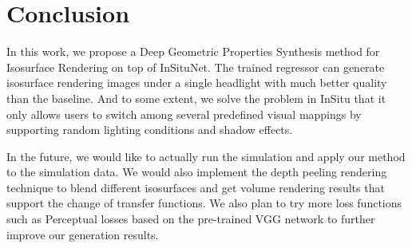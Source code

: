 \documentclass[journal]{vgtc}                %
\begin{document}
\section{Conclusion}
In this work, we propose a Deep Geometric Properties Synthesis method for Isosurface Rendering on top of InSituNet. The trained regressor can generate isosurface rendering images under a single headlight with much better quality than the baseline. And to some extent, we solve the problem in InSitu that it only allows users to switch among several predefined visual mappings by supporting random lighting conditions and shadow effects. 

In the future, we would like to actually run the simulation and apply our method to the simulation data. We would also implement the depth peeling rendering technique to blend different isosurfaces and get volume rendering results that support the change of transfer functions. We also plan to try more loss functions such as Perceptual losses based on the pre-trained VGG network \cite{gatys2016image} to further improve our generation results. 

%

%
%
%


\end{document}
